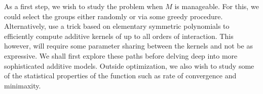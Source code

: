 As a first step, we wish to study the problem when $M$ is manageable. For this,
we could select the groups either randomly or via some greedy procedure.
Alternatively, \citep{duvenaud11additivegps} use a trick based on elementary
symmetric polynomials to efficiently compute additive kernels of up to all
orders of interaction. This however, will require some parameter sharing between
the kernels and not be as expressive. We shall first explore these paths before
delving deep into more sophisticated additive models.
Outside optimization, we also wish to study some of the statistical properties
of the function such as rate of convergence and minimaxity.


